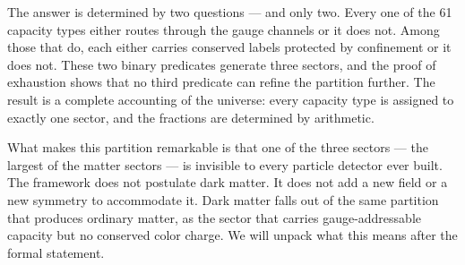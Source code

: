 \documentclass[11pt]{article}
\begin{document}
The answer is determined by two questions --- and only two.  Every one of the 61 capacity types either routes through the gauge channels or it does not.  Among those that do, each either carries conserved labels protected by confinement or it does not.  These two binary predicates generate three sectors, and the proof of exhaustion shows that no third predicate can refine the partition further.  The result is a complete accounting of the universe: every capacity type is assigned to exactly one sector, and the fractions are determined by arithmetic.

What makes this partition remarkable is that one of the three sectors --- the largest of the matter sectors --- is invisible to every particle detector ever built.  The framework does not postulate dark matter.  It does not add a new field or a new symmetry to accommodate it.  Dark matter falls out of the same partition that produces ordinary matter, as the sector that carries gauge-addressable capacity but no conserved color charge.  We will unpack what this means after the formal statement.
\end{document}
